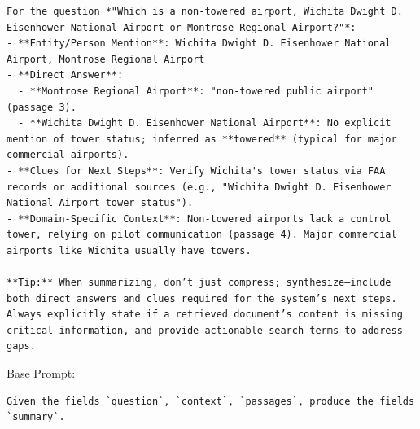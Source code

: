 \begin{instructbox}
\begin{lstlisting}[breakindent=0pt, breaklines=true, breakatwhitespace=true, frame=single, backgroundcolor=\color{blue!10}]
For the question *"Which is a non-towered airport, Wichita Dwight D. Eisenhower National Airport or Montrose Regional Airport?"*:  
- **Entity/Person Mention**: Wichita Dwight D. Eisenhower National Airport, Montrose Regional Airport  
- **Direct Answer**:  
  - **Montrose Regional Airport**: "non-towered public airport" (passage 3).  
  - **Wichita Dwight D. Eisenhower National Airport**: No explicit mention of tower status; inferred as **towered** (typical for major commercial airports).  
- **Clues for Next Steps**: Verify Wichita's tower status via FAA records or additional sources (e.g., "Wichita Dwight D. Eisenhower National Airport tower status").  
- **Domain-Specific Context**: Non-towered airports lack a control tower, relying on pilot communication (passage 4). Major commercial airports like Wichita usually have towers.  

**Tip:** When summarizing, don’t just compress; synthesize—include both direct answers and clues required for the system’s next steps. Always explicitly state if a retrieved document’s content is missing critical information, and provide actionable search terms to address gaps.
\end{lstlisting}
\end{instructbox}\begin{instructbox}
Base Prompt:
\begin{lstlisting}[breakindent=0pt, breaklines=true, breakatwhitespace=true, frame=single, backgroundcolor=\color{gray!10}]
Given the fields `question`, `context`, `passages`, produce the fields `summary`.
\end{lstlisting}


\end{instructbox}
